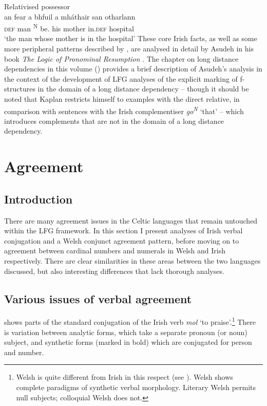 \documentclass[output=paper,colorlinks,citecolor=brown]{langscibook}
\begin{document}
\ex Relativised possessor\\
\gll an fear a bhfuil a mháthair san  otharlann\\
\textsc{def} man {\REL}\textsuperscript{\tiny N} {be.\PRS} his mother in.\textsc{def} hospital\\
\glt`the man whose mother is in the hospital'
\z\z
These core Irish facts, as well as some more peripheral patterns described by \citet{McCloskey:2002}, are analysed in detail by Asudeh in his book \emph{The Logic of Pronominal Resumption} \citep[chapter~7]{Asudeh12}. The chapter on long distance dependencies in this volume () provides a brief description of Asudeh's analysis in the context of the development of LFG analyses of the explicit marking of f-structures in the domain of a long distance dependency -- though it should be noted that Kaplan restricts himself to examples with the direct relative, in comparison with sentences with the Irish complementiser \emph{go}\textsuperscript{\tiny\textit N} `that' -- which introduces complements that are not in the domain of a long distance dependency.


\section{Agreement}
\label{sec:Celtic:4}

\subsection{Introduction}
\label{sec:Celtic:4.1}

There are many agreement issues in the Celtic languages that remain untouched within the LFG framework. In this section I present analyses of Irish verbal conjugation and a Welsh conjunct agreement pattern, before moving on to agreement between cardinal numbers and numerals in Welsh and Irish respectively. There are clear similarities in these areas between the two languages discussed, but also interesting differences that lack thorough analyses.

\subsection{Various issues of verbal agreement}
\label{sec:Celtic:4.2}

 shows parts of the standard conjugation of the Irish verb \emph{mol} `to praise'.\footnote{Welsh is quite different from Irish in this respect (see \citealt[9--10]{BorsleyTallermanWillis2007}). Welsh shows complete paradigms of synthetic verbal morphology. Literary Welsh permits null subjects; colloquial Welsh does not.} There is variation between analytic forms, which take a separate pronoun (or noun) subject, and synthetic forms (marked in bold) which are conjugated for person and number.
\end{document}
